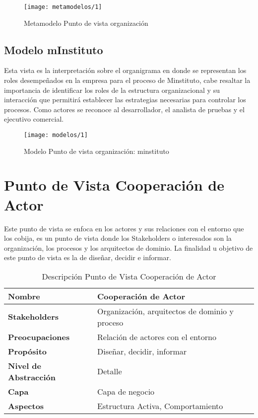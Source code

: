  \begin{figure}[H]
   \centering
   \texttt{[image: metamodelos/1]}
   \captionsetup{width=.95\textwidth}
   \caption{Metamodelo Punto de vista organización}
   \label{metamodelo1}
 \end{figure}

 \subsection{Modelo mInstituto}
 Esta vista es la interpretación sobre el organigrama en donde se representan los roles desempeñados en la empresa para el proceso de Minstituto, cabe resaltar la importancia de identificar los roles de la estructura organizacional y su interacción que permitirá establecer las estrategias necesarias para controlar los procesos.  Como actores se reconoce al desarrollador, el analista de pruebas y el ejecutivo comercial.
  \begin{figure}[H]
   \centering
   \texttt{[image: modelos/1]}
   \captionsetup{width=.95\textwidth}
   \caption{Modelo Punto de vista organización: minstituto}
   \label{modelo1}
  \end{figure}
  
  \section{Punto de Vista Cooperación de Actor}
  Este punto de vista se enfoca en los actores y sus relaciones con el entorno que los cobija, es un punto de vista donde los Stakeholders o interesados son la organización, los procesos y los arquitectos de dominio. La finalidad u objetivo de este punto de vista es la de diseñar, decidir e informar.
  
  \begin{table}[H]
  	\centering
  	\begin{tabular}{lp{8cm}}
  		\toprule
  		\textbf{Nombre} & \textbf{Cooperación de Actor} \\
  		\midrule
  		\textbf{Stakeholders} & Organización, arquitectos de dominio y proceso \\
  		\textbf{Preocupaciones} & Relación de actores con el entorno \\
  		\textbf{Propósito} & Diseñar, decidir, informar \\
  		\textbf{Nivel de Abstracción} & Detalle \\
  		\textbf{Capa} & Capa de negocio \\
  		\textbf{Aspectos} & Estructura Activa, Comportamiento \\
  		\bottomrule
  	\end{tabular}
  	\captionsetup{width=.95\textwidth}
  	\caption{Descripción Punto de Vista Cooperación de Actor}
  	\label{tabla5}
  \end{table}
  
